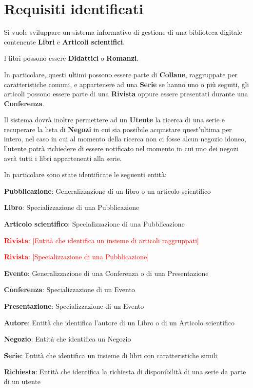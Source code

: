 \chapter{Requisiti identificati}
Si vuole sviluppare un sistema informativo di gestione di una biblioteca digitale contenente \textbf{Libri} e
\textbf{Articoli scientifici}.

I libri possono essere \textbf{Didattici} o \textbf{Romanzi}.

In particolare, questi ultimi possono essere parte di \textbf{Collane}, raggruppate per caratteristiche
comuni, e appartenere ad una \textbf{Serie} se hanno uno o più seguiti, gli articoli possono essere parte
di una \textbf{Rivista} oppure essere presentati durante una \textbf{Conferenza}.

Il sistema dovrà inoltre permettere ad un \textbf{Utente} la ricerca di una serie
e recuperare la lista di \textbf{Negozi} in cui sia possibile acquistare quest'ultima per intero,
nel caso in cui al momento della ricerca non ci fosse alcun negozio idoneo, l'utente potrà richiedere
di essere notificato nel momento in cui uno dei negozi avrà tutti i libri appartenenti alla serie.


In particolare sono state identificate le seguenti entità:
\begin{enumerate}
    \item \textbf{Pubblicazione}: Generalizzazione di un libro o un articolo scientifico
    \item \textbf{Libro}: Specializzazione di una Pubblicazione
    \item \textbf{Articolo scientifico}: Specializzazione di una Pubblicazione
    \textcolor{red}{
        \item \textbf{Rivista}: [Entità che identifica un insieme di articoli raggruppati]
        \item \textbf{Rivista}: [Specializzazione di una Pubblicazione]
        }
    \item \textbf{Evento}: Generalizzazione di una Conferenza o di una Presentazione
    \item \textbf{Conferenza}: Specializzazione di un Evento
    \item \textbf{Presentazione}: Specializzazione di un Evento
    \item \textbf{Autore}: Entità che identifica l'autore di un Libro o di un Articolo scientifico
    \item \textbf{Negozio}: Entità che identifica un Negozio
    \item \textbf{Serie}: Entità che identifica un insieme di libri con caratteristiche simili
    \item \textbf{Richiesta}: Entità che identifica la richiesta di disponibilità di una serie da 
    parte di un utente
\end{enumerate}